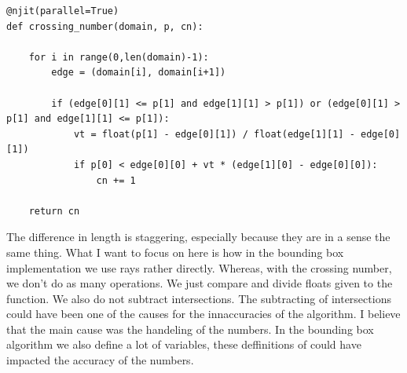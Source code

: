 \documentclass{article}
\begin{document}
\begin{lstlisting}
@njit(parallel=True)
def crossing_number(domain, p, cn):

    for i in range(0,len(domain)-1):
        edge = (domain[i], domain[i+1])
        
        if (edge[0][1] <= p[1] and edge[1][1] > p[1]) or (edge[0][1] > p[1] and edge[1][1] <= p[1]):
            vt = float(p[1] - edge[0][1]) / float(edge[1][1] - edge[0][1])
            if p[0] < edge[0][0] + vt * (edge[1][0] - edge[0][0]): 
                cn += 1

    return cn

\end{lstlisting}

The difference in length is staggering, especially because they are in a sense the same thing.
What I want to focus on here is how in the bounding box implementation we use rays rather directly.
Whereas, with the crossing number, we don't do as many operations.
We just compare and divide floats given to the function.
We also do not subtract intersections.
The subtracting of intersections could have been one of the causes for the innaccuracies of the algorithm.
I believe that the main cause was the handeling of the numbers.
In the bounding box algorithm we also define a lot of variables, these deffinitions of could have impacted the accuracy of the numbers.
\end{document}
